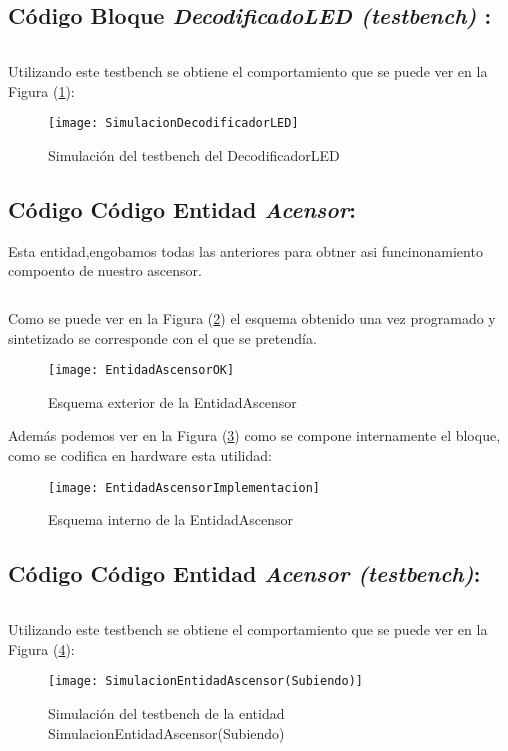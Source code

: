 \subsection {Código Bloque \textit{DecodificadoLED (testbench)} :} \label{code:DecodificadorLED_tb}
	\inputminted[frame=lines,fontsize=\footnotesize,linenos]{vhdl}{CodeFiles/DecodificadorLED_tb.vhd}

    Utilizando este testbench se obtiene el comportamiento que se puede ver en la Figura (\ref{fig:SimulacionDecodificadorLED}):

    \begin{figure}[H]
		    \centering
		    \texttt{[image: SimulacionDecodificadorLED]}
		    \caption{Simulación del testbench del DecodificadorLED}
		    \label{fig:SimulacionDecodificadorLED}
	\end{figure}
\subsection{Código Código Entidad \textit{Acensor}:} \label{code:Acensor}
Esta entidad,engobamos todas las anteriores para obtner asi funcinonamiento compoento de nuestro ascensor. \\ 
	\inputminted[frame=lines,fontsize=\footnotesize,linenos]{vhdl}{CodeFiles/EntidadAscensor.vhd}

	Como se puede ver en la Figura (\ref{fig:EntidadAscensorOK}) el esquema obtenido una vez programado y sintetizado se corresponde con el que se pretendía.
    \begin{figure}[H]
		    \centering
		    \texttt{[image: EntidadAscensorOK]}
		    \caption{Esquema exterior de la EntidadAscensor}
		    \label{fig:EntidadAscensorOK}
	\end{figure}
    Además podemos ver en la Figura (\ref{fig:EntidadAscensorImplementacion}) como se compone internamente el bloque, como se codifica en hardware esta utilidad:
    \begin{figure}[H]
		    \centering
		    \texttt{[image: EntidadAscensorImplementacion]}
		    \caption{Esquema interno de la EntidadAscensor}
		    \label{fig:EntidadAscensorImplementacion}
	\end{figure}

\subsection{Código Código Entidad \textit{Acensor (testbench)}:} \label{code:Acensor_tb}
\inputminted[frame=lines,fontsize=\footnotesize,linenos]{vhdl}{CodeFiles/EntidadAscensor_tb.vhd}

    Utilizando este testbench se obtiene el comportamiento que se puede ver en la Figura (\ref{fig:SimulacionEntidadAscensor}):

    \begin{figure}[H]
		    \centering
		    \texttt{[image: SimulacionEntidadAscensor(Subiendo)]}
		    \caption{Simulación del testbench de la entidad SimulacionEntidadAscensor(Subiendo)}
		    \label{fig:SimulacionEntidadAscensor}
	\end{figure}
